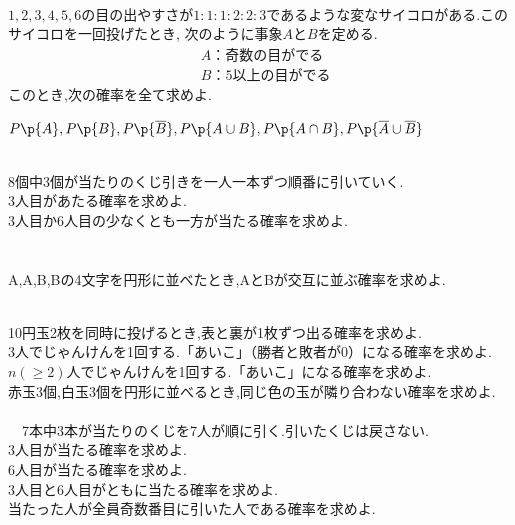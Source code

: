 \documentclass[10pt,fleqn,a4paper]{jsarticle}
\newcommand{\ans}[1]{\mbox{\boldmath{$#1$}}}
\begin{document}
\newpage
\noindent{}\\
$1,2,3,4,5,6$の目の出やすさが$1:1:1:2:2:3$であるような変なサイコロがある.このサイコロを一回投げたとき,
次のように事象$A$と$B$を定める.
\begin{align*}
    &A：奇数の目がでる\\
    &B：5以上の目がでる
\end{align*}
このとき,次の確率を全て求めよ.\\
\begin{center}
    $P\p{A},P\p{B},P\p{\overline{B}},P\p{A\cup B},P\p{A\cap B},P\p{\overline{A}\cup \overline{B}}$
\end{center}
\\
8個中3個が当たりのくじ引きを一人一本ずつ順番に引いていく.\\
\kakkoichi 3人目があたる確率を求めよ.\\
\kakkoni 3人目か6人目の少なくとも一方が当たる確率を求めよ.\\\\
\\
A,A,B,Bの4文字を円形に並べたとき,AとBが交互に並ぶ確率を求めよ.
\newpage
\begin{center}
    \ans{7章の問題演習}
\end{center}
\reibanichi\\
\kakkoichi 10円玉2枚を同時に投げるとき,表と裏が1枚ずつ出る確率を求めよ.\\
\kakkoni 3人でじゃんけんを1回する.「あいこ」（勝者と敗者が0）になる確率を求めよ.\\
\kakkosan $n(\geq2)$人でじゃんけんを1回する.「あいこ」になる確率を求めよ.\\
\kakkoshi 赤玉3個,白玉3個を円形に並べるとき,同じ色の玉が隣り合わない確率を求めよ.\\\\
\reibanni　7本中3本が当たりのくじを7人が順に引く.引いたくじは戻さない.\\
\kakkoichi 3人目が当たる確率を求めよ.\\
\kakkoni 6人目が当たる確率を求めよ.\\
\kakkosan 3人目と6人目がともに当たる確率を求めよ.\\
\kakkoshi 当たった人が全員奇数番目に引いた人である確率を求めよ.
\newpage
\end{document}
